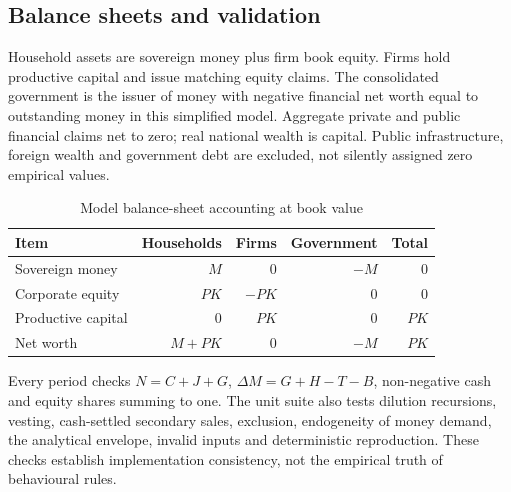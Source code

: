 \subsection{Balance sheets and validation}
Household assets are sovereign money plus firm book equity. Firms hold productive capital and issue matching equity claims. The consolidated government is the issuer of money with negative financial net worth equal to outstanding money in this simplified model. Aggregate private and public financial claims net to zero; real national wealth is capital. Public infrastructure, foreign wealth and government debt are excluded, not silently assigned zero empirical values.

\begin{table}[htbp]\centering\small
\caption{Model balance-sheet accounting at book value}
\begin{tabular}{@{}lrrrr@{}}
\toprule
Item & Households & Firms & Government & Total\\
\midrule
Sovereign money & $M$ & 0 & $-M$ & 0\\
Corporate equity & $PK$ & $-PK$ & 0 & 0\\
Productive capital & 0 & $PK$ & 0 & $PK$\\
Net worth & $M+PK$ & 0 & $-M$ & $PK$\\
\bottomrule
\end{tabular}
\end{table}

Every period checks $N=C+J+G$, $\Delta M=G+H-T-B$, non-negative cash and equity shares summing to one. The unit suite also tests dilution recursions, vesting, cash-settled secondary sales, exclusion, endogeneity of money demand, the analytical envelope, invalid inputs and deterministic reproduction. These checks establish implementation consistency, not the empirical truth of behavioural rules.

